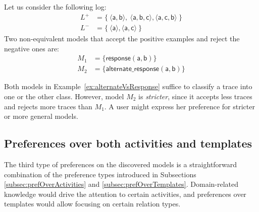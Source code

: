 \begin{example}
\label{ex:alternateVsResponse}
Let us consider the following log:
\begin{align*}
L^+ & = \{\ \langle \mathsf{a}, \mathsf{b} \rangle,\ \langle \mathsf{a}, \mathsf{b}, \mathsf{c} \rangle, \langle \mathsf{a}, \mathsf{c}, \mathsf{b} \rangle \ \} \\
L^- & = \{\ \langle \mathsf{a} \rangle, \langle \mathsf{a}, \mathsf{c} \rangle \ \}
\end{align*}
%
Two non-equivalent models that accept the positive examples and reject the negative ones are:
\begin{align*}
M_1 & = \{ \mathsf{response(a,b)}\} \\
M_2 & = \{ \mathsf{alternate\_response(a, b)}\} \tag*{$\square$}
\end{align*}
\end{example}

Both models in Example~\ref{ex:alternateVsResponse} 
suffice to classify a trace into one or the other class. However, model $M_2$ %
is \emph{stricter}, since it accepts less traces and rejects more traces than $M_1$. %
A  user might express her preference for stricter or more general models.


\subsection{Preferences over both activities and templates}
\label{sub:prefOverBoth}

The third type of preferences on the discovered models is a straightforward combination of the preference types introduced in Subsections \ref{subsec:prefOverActivities} and \ref{subsec:prefOverTemplates}. Domain-related knowledge would drive the attention to certain activities, and preferences over templates would allow focusing on certain relation types.%


